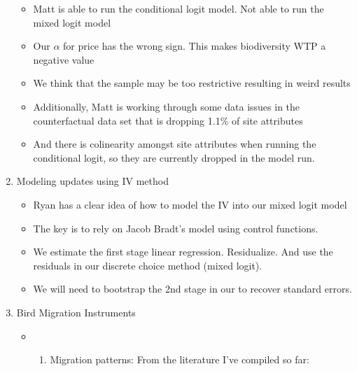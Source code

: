\documentclass[
  letterpaper,
]{article}
\providecommand{\tightlist}{%
  \setlength{\itemsep}{0pt}\setlength{\parskip}{0pt}}\usepackage{longtable,booktabs,array}
\begin{document}
\begin{tcolorbox}
\begin{enumerate}
  \begin{itemize}
  \tightlist
  \item
    Matt is able to run the conditional logit model. Not able to run the
    mixed logit model
  \item
    Our \(\alpha\) for price has the wrong sign. This makes biodiversity
    WTP a negative value
  \item
    We think that the sample may be too restrictive resulting in weird
    results
  \item
    Additionally, Matt is working through some data issues in the
    counterfactual data set that is dropping 1.1\% of site attributes
  \item
    And there is colinearity amongst site attributes when running the
    conditional logit, so they are currently dropped in the model run.
  \end{itemize}
\item
  Modeling updates using IV method

  \begin{itemize}
  \tightlist
  \item
    Ryan has a clear idea of how to model the IV into our mixed logit
    model
  \item
    The key is to rely on Jacob Bradt's model using control functions.
  \item
    We estimate the first stage linear regression. Residualize. And use
    the residuals in our discrete choice method (mixed logit).
  \item
    We will need to bootstrap the 2nd stage in our to recover standard
    errors.
  \end{itemize}
\item
  Bird Migration Instruments

  \begin{itemize}
  \item
    \begin{enumerate}
    \def\labelenumii{(\roman{enumii})}
    \tightlist
    \item
      Migration patterns: From the literature I've compiled so far:
    \end{enumerate}


\end{itemize}
\end{enumerate}
\end{tcolorbox}
\end{document}

